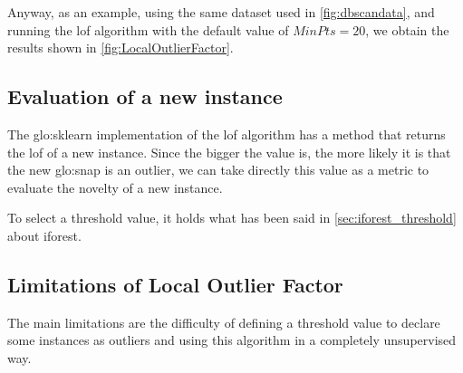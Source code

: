 Anyway, as an example, using the same dataset used in \autoref{fig:dbscandata}, and running the \gls{lof} algorithm with the default value of $MinPts=20$, we obtain the results shown in \autoref{fig:LocalOutlierFactor}.

\subsection{Evaluation of a new instance}
\label{sec:lof_eval}
The \gls{glo:sklearn} implementation of the \gls{lof} algorithm has a method that returns the \gls{lof} of a new instance. Since the bigger the value is, the more likely it is that the new \gls{glo:snap} is an outlier, we can take directly this value as a metric to evaluate the novelty of a new instance.

To select a threshold value, it holds what has been said in \autoref{sec:iforest_threshold} about \gls{iforest}.


\subsection{Limitations of Local Outlier Factor}
\label{sec:lof_limitations}
The main limitations are the difficulty of defining a threshold value to declare some instances as outliers and using this algorithm in a completely unsupervised way.


